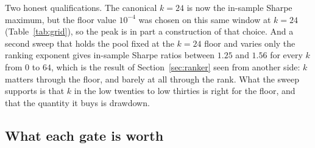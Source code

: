 \documentclass[11pt]{article}
\begin{document}
Two honest qualifications. The canonical $k = 24$ is now the in-sample Sharpe
maximum, but the floor value $10^{-4}$ was chosen on this same window at
$k = 24$ (Table~\ref{tab:grid}), so the peak is in part a construction of that
choice. And a second sweep that holds the pool fixed at the $k = 24$ floor and
varies only the ranking exponent gives in-sample Sharpe ratios between $1.25$
and $1.56$ for every $k$ from $0$ to $64$, which is the result of
Section~\ref{sec:ranker} seen from another side: $k$ matters through the
floor, and barely at all through the rank. What the sweep supports is that $k$
in the low twenties to low thirties is right for the floor, and that the
quantity it buys is drawdown.

\subsection{What each gate is worth}
\label{sec:gates}
\end{document}
